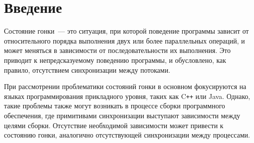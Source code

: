 \section{Введение}
\label{sec:Chapter0} 


Состояние гонки~--- это ситуация, при которой поведение программы зависит от относительного порядка выполнения двух или более параллельных операций, и может меняться в зависимости от последовательности их выполнения. Это приводит к непредсказуемому поведению программы, и обусловлено, как правило, отсутствием синхронизации между потоками.

При рассмотрении проблематики состояний гонки в основном фокусируются на языках программирования прикладного уровня, таких как C\texttt{++} или Java. Однако, такие проблемы также могут возникать в процессе сборки программного обеспечения, где примитивами синхронизации выступают зависимости между целями сборки. Отсутствие необходимой зависимости может привести к состоянию гонки, аналогично отсутствующей синхронизации между процессами.

